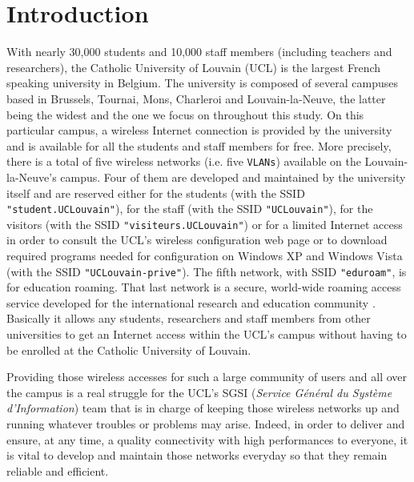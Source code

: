 
\chapter{Introduction} %

\label{Chapter1} %


With nearly 30,000 students and 10,000 staff members (including teachers and researchers), the Catholic University of Louvain (UCL) is the largest French speaking university in Belgium. The university is composed of several campuses based in Brussels, Tournai, Mons, Charleroi and Louvain-la-Neuve, the latter being the widest and the one we focus on throughout this study. On this particular campus, a wireless Internet connection is provided by the university and is available for all the students and staff members for free. More precisely, there is a total of five wireless networks (i.e. five \texttt{VLANs}) available on the Louvain-la-Neuve's campus. Four of them are developed and maintained by the university itself and are reserved either for the students (with the SSID \texttt{"student.UCLouvain"}), for the staff (with the SSID \texttt{"UCLouvain"}), for the visitors (with the SSID \texttt{"visiteurs.UCLouvain"}) or for a limited Internet access in order to consult the UCL's wireless configuration web page or to download required programs needed for configuration on Windows XP and Windows Vista (with the SSID \texttt{"UCLouvain-prive"}). The fifth network, with SSID \texttt{"eduroam"}, is for education roaming. That last network is a secure, world-wide roaming access service developed for the international research and education community \cite{eduroam1}. Basically it allows any students, researchers and staff members from other universities to get an Internet access within the UCL's campus without having to be enrolled at the Catholic University of Louvain.

Providing those wireless accesses for such a large community of users and all over the campus is a real struggle for the UCL's SGSI (\textit{Service Général du Système d'Information}) team that is in charge of keeping those wireless networks up and running whatever troubles or problems may arise. Indeed, in order to deliver and ensure, at any time, a quality connectivity with high performances to everyone, it is vital to develop and maintain those networks everyday so that they remain reliable and efficient.
 
